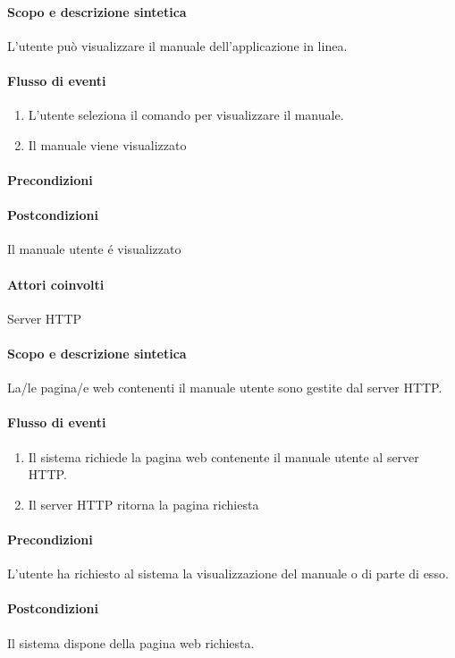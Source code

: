 \paragraph{Scopo e descrizione sintetica}
L'utente pu\`o visualizzare il manuale dell'applicazione in linea.
\paragraph{Flusso di eventi}
\begin{enumerate}
\item L'utente seleziona il comando per visualizzare il manuale. 
\item Il manuale viene visualizzato
\end{enumerate}
\paragraph{Precondizioni}
\paragraph{Postcondizioni} Il manuale utente \'e visualizzato

\paragraph{Attori coinvolti} Server HTTP
\paragraph{Scopo e descrizione sintetica}
La/le pagina/e web contenenti il manuale utente sono gestite dal server HTTP.
\paragraph{Flusso di eventi}
\begin{enumerate}
\item Il sistema richiede la pagina web contenente il manuale utente al server HTTP.
\item Il server HTTP ritorna la pagina richiesta
\end{enumerate}
\paragraph{Precondizioni} L'utente ha richiesto al sistema la visualizzazione del manuale o di parte di esso.
\paragraph{Postcondizioni} Il sistema dispone della pagina web richiesta.


